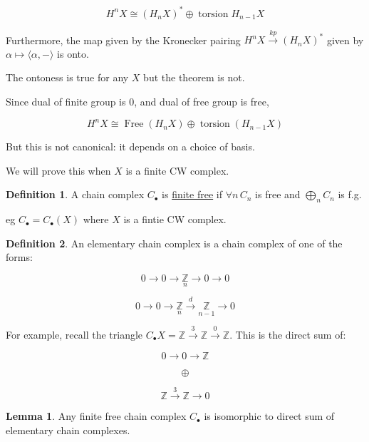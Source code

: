 \documentclass{article}
\theoremstyle{definition}
\newtheorem*{definition}{Definition}
\newtheorem{lemma}[theorem]{Lemma}
\begin{document}
    \[
        H^n X \cong (H_n X)^{\ast} \oplus \operatorname{torsion} H_{n-1} X
    \]

    Furthermore, the map given by the Kronecker pairing \(H^n X \xrightarrow{kp} (H_n X)^{\ast}\) given by \(\alpha \mapsto \langle \alpha, - \rangle\) is onto.

    The ontoness is true for any \(X\) but the theorem is not.

    Since dual of finite group is \(0\), and dual of free group is free,

    \[
        H^n X \cong \operatorname{Free}(H_n X) \oplus \operatorname{torsion} (H_{n-1} X)
    \]

    But this is not canonical: it depends on a choice of basis.

    We will prove this when \(X\) is a finite CW complex.

    \begin{definition}
        A chain complex \(C_\bullet\) is \underline{finite free} if \(\forall n\, C_n\) is free and \(\bigoplus_{n} C_n\) is f.g.

        eg \(C_\bullet = C_\bullet(X)\) where \(X\) is a fintie CW complex.
    \end{definition}

    \begin{definition}
        An elementary chain complex is a chain complex of one of the forms:

        \[
            0 \to 0 \to \underset{n}{\mathbb{Z}} \to 0 \to 0
        \]

        \[
            0 \to  0 \to \underset{n}{\mathbb{Z}} \xrightarrow{d} \underset{n-1}{\mathbb{Z}} \to 0
        \]
    \end{definition}

    For example, recall the triangle \(C_\bullet X = \mathbb{Z} \xrightarrow{3} \mathbb{Z} \xrightarrow{0}\mathbb{Z}\). This is the direct sum of:

    \[
        0 \to 0 \to \mathbb{Z}
    \]

    \[
        \oplus
    \]

    \[
        \mathbb{Z} \xrightarrow{3} \mathbb{Z} \to 0
    \]

    \begin{lemma}
        Any finite free chain complex \(C_\bullet\) is isomorphic to direct sum of elementary chain complexes.
    \end{lemma}
\end{document}
